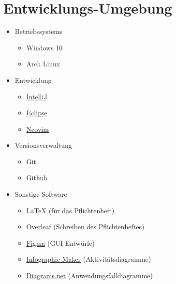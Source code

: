 \section{Entwicklungs-Umgebung}
        \begin{itemize}[noitemsep]
            \item \glspl{Betriebssystem} 
                \begin{itemize}[noitemsep]
                    \item Windows 10
                    \item Arch Linux
                \end{itemize}
            \item Entwicklung %
            \begin{itemize}[noitemsep]
                \item \href{https://www.jetbrains.com/de-de/idea/}{IntelliJ}
                \item \href{https://www.eclipse.org/downloads/}{Eclipse}
                \item \href{https://neovim.io/}{Neovim}
            \end{itemize}
            \item \gls{Versionsverwaltung}
                \begin{itemize}[noitemsep]
                    \item Git
                    \item Github
                \end{itemize}
            \item Sonstige Software
                \begin{itemize}[noitemsep]
                    \item \LaTeX \hspace{0.1cm} (für das Pflichtenheft)
                    \item \href{https://de.overleaf.com}{Overleaf} (Schreiben des Pflichtenheftes)
                    \item \href{https://www.figma.com}{Figma} (GUI-Entwürfe)
                    \item \href{https://online.visual-paradigm.com/}{Infographic Maker} (Aktivitätsdiagramme)
                    \item \href{https://app.diagrams.net/}{Diagrams.net} (Anwendungsfalldiagramme)
                \end{itemize}
        \end{itemize}
